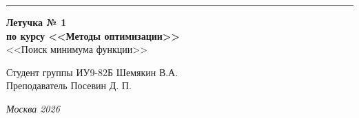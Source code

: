 \documentclass[a4paper, 14pt]{extarticle}
\begin{document}
\begin{titlepage}
\vspace*{-16pt}
\hspace{30pt}\rule{0.866\textwidth}{0.4pt}
  
\vspace{11em}

\begin{center}
\Large {\bf Летучка № 1} \\ 
\large {\bf по курсу <<Методы оптимизации>>} \\
\large <<Поиск минимума функции>> 
\end{center}\normalsize

\vspace{8em}


\begin{flushright}
  {Студент группы ИУ9-82Б Шемякин В.А. \hspace*{15pt}\\ 
  \vspace{2ex}
  Преподаватель Посевин Д. П.\hspace*{15pt}}
\end{flushright}

\bigskip

\vfill
 

\begin{center}
\textsl{Москва 2026}
\end{center}
\end{titlepage}

\renewcommand{\ttdefault}{pcr}

\setlength{\tabcolsep}{3pt}
\newpage
\setcounter{page}{2}
\end{document}
